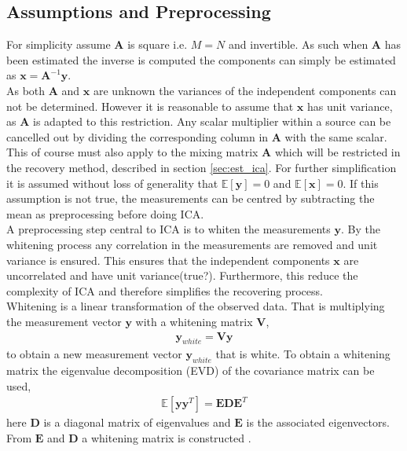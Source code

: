 \subsection{Assumptions and Preprocessing}
For simplicity assume $\textbf{A}$ is square i.e. $M=N$ and invertible. As such when $\textbf{A}$ has been estimated the inverse is computed the components can simply be estimated as $\textbf{x}=\textbf{A}^{-1}\textbf{y}$\cite[p. 152-153]{ICA}.
\\ 
As both $\textbf{A}$ and $\textbf{x}$ are unknown the variances of the independent components can not be determined. However it is reasonable to assume that $\mathbf{x}$ has unit variance, as $\textbf{A}$ is adapted to this restriction. Any scalar multiplier within a source can be cancelled out by dividing the corresponding column in $\textbf{A}$ with the same scalar.\\  
This of course must also apply to the mixing matrix $\mathbf{A}$ which will be restricted in the recovery method, described in section \ref{sec:est_ica}.
For further simplification it is assumed without loss of generality that $\mathbb{E}[\mathbf{y}] = 0$ and $\mathbb{E}[\mathbf{x}] = 0$\cite[p. 154]{ICA}. If this assumption is not true, the measurements can be centred by subtracting the mean as preprocessing before doing ICA.\\
A preprocessing step central to ICA is to whiten the measurements $\mathbf{y}$. By the whitening process any correlation in the measurements are removed and unit variance is ensured. This ensures that the independent components $\mathbf{x}$ are uncorrelated and have unit variance(true?). Furthermore, this reduce the complexity of ICA and therefore simplifies the recovering process.
\\
Whitening is a linear transformation of the observed data. That is multiplying the measurement vector $\textbf{y}$ with a whitening matrix $\textbf{V}$,
\begin{align*}
\textbf{y}_{white} = \textbf{V}\textbf{y}
\end{align*} 
to obtain a new measurement vector $\textbf{y}_{white}$ that is white. To obtain a whitening matrix the eigenvalue decomposition (EVD) of the covariance matrix can be used,
\begin{align*}
\mathbb{E}[\mathbf{yy}^T] = \mathbf{EDE}^T
\end{align*}
here $\mathbf{D}$ is a diagonal matrix of eigenvalues and $\mathbf{E}$ is the associated eigenvectors. From $\mathbf{E}$ and $\mathbf{D}$ a whitening matrix is constructed \cite[p.159]{ICA}.
